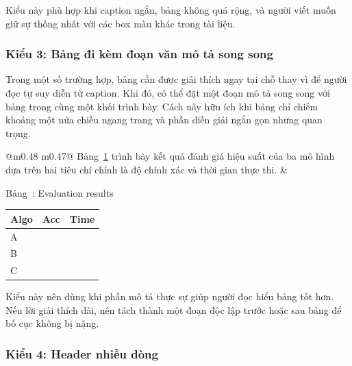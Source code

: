 \documentclass[12pt]{eDA_conquer2026}
\begin{document}
Kiểu này phù hợp khi caption ngắn, bảng không quá rộng, và người viết muốn giữ sự thống nhất với các box màu khác trong tài liệu.

\subsubsection{Kiểu 3: Bảng đi kèm đoạn văn mô tả song song}

Trong một số trường hợp, bảng cần được giải thích ngay tại chỗ thay vì để người đọc tự suy diễn từ caption. Khi đó, có thể đặt một đoạn mô tả song song với bảng trong cùng một khối trình bày. Cách này hữu ích khi bảng chỉ chiếm khoảng một nửa chiều ngang trang và phần diễn giải ngắn gọn nhưng quan trọng.

\begin{table}[H]
\centering
\begin{tabular}{@{}m{0.48\linewidth} m{0.47\linewidth}@{}}
  \justifying
  \noindent Bảng~\ref{tab:eval-parallel} trình bày kết quả đánh giá hiệu suất của ba mô hình dựa trên hai tiêu chí chính là độ chính xác và thời gian thực thi.
  &
  \begin{minipage}{\linewidth}
    \begin{captionbelowboxaivn}
      Bảng~\thetable: Evaluation results
      \label{tab:eval-parallel}
    \end{captionbelowboxaivn}
    \renewcommand{\arraystretch}{1.3}
    \begin{tabularx}{\linewidth}{@{}>{\centering\arraybackslash}X >{\centering\arraybackslash}X >{\centering\arraybackslash}X@{}}
      \toprule
      \textbf{Algo} & \textbf{Acc} & \textbf{Time} \\
      \midrule
      A & 92.3 & 1.45 \\
      B & 89.7 & 1.32 \\
      C & 94.5 & 1.67 \\
      \bottomrule
    \end{tabularx}
  \end{minipage}
\end{tabular}
\end{table}

Kiểu này nên dùng khi phần mô tả thực sự giúp người đọc hiểu bảng tốt hơn. Nếu lời giải thích dài, nên tách thành một đoạn độc lập trước hoặc sau bảng để bố cục không bị nặng.

\subsubsection{Kiểu 4: Header nhiều dòng}
\end{document}
